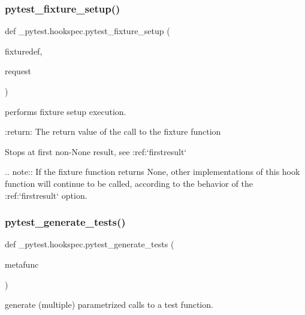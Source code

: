 \subsubsection{\texorpdfstring{pytest\+\_\+fixture\+\_\+setup()}{pytest\_fixture\_setup()}}
{\footnotesize\ttfamily def \+\_\+pytest.\+hookspec.\+pytest\+\_\+fixture\+\_\+setup (\begin{DoxyParamCaption}\item[{}]{fixturedef,  }\item[{}]{request }\end{DoxyParamCaption})}

\begin{DoxyVerb}performs fixture setup execution.

:return: The return value of the call to the fixture function

Stops at first non-None result, see :ref:`firstresult`

.. note::
    If the fixture function returns None, other implementations of
    this hook function will continue to be called, according to the
    behavior of the :ref:`firstresult` option.
\end{DoxyVerb}
 \mbox{\label{namespace__pytest_1_1hookspec_af59c92592305cc7f808232b6c852b4c1}} 
\subsubsection{\texorpdfstring{pytest\+\_\+generate\+\_\+tests()}{pytest\_generate\_tests()}}
{\footnotesize\ttfamily def \+\_\+pytest.\+hookspec.\+pytest\+\_\+generate\+\_\+tests (\begin{DoxyParamCaption}\item[{}]{metafunc }\end{DoxyParamCaption})}

\begin{DoxyVerb}generate (multiple) parametrized calls to a test function.\end{DoxyVerb}
 \mbox{\label{namespace__pytest_1_1hookspec_a358c7b44a8494a6a09b517d91bc48d83}} 
